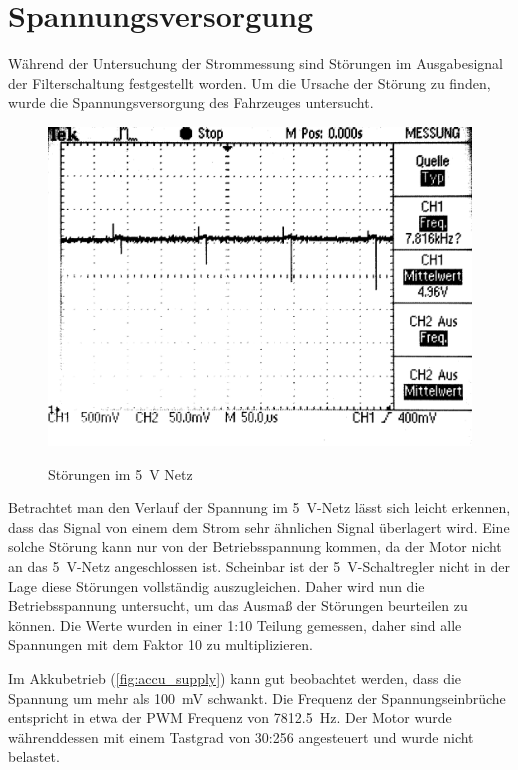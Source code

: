\section{Spannungsversorgung}

Während der Untersuchung der Strommessung sind Störungen im Ausgabesignal der Filterschaltung festgestellt worden. Um die Ursache der Störung zu finden, wurde die Spannungsversorgung
des Fahrzeuges untersucht.

\begin{figure}[H]
\centering
\includegraphics[width=.8\textwidth]{5V_supply.png}\\
\caption{Störungen im \SI{5}{\V} Netz}%
\label{fig:5V Supply}
\end{figure}

Betrachtet man den Verlauf der Spannung im \SI{5}{\V}-Netz lässt sich leicht erkennen, dass das Signal von einem dem Strom sehr ähnlichen Signal überlagert wird.
Eine solche Störung kann nur von der Betriebsspannung kommen, da der Motor nicht an das \SI{5}{\V}-Netz angeschlossen ist. Scheinbar ist der \SI{5}{\V}-Schaltregler nicht in der
Lage diese Störungen vollständig auszugleichen.
Daher wird nun die Betriebsspannung untersucht, um das Ausmaß der Störungen beurteilen zu können.
Die Werte wurden in einer 1:10 Teilung gemessen, daher sind alle Spannungen mit dem Faktor 10 zu multiplizieren.

Im Akkubetrieb (\cref{fig:accu_supply}) kann gut beobachtet werden, dass die Spannung um mehr als \SI{100}{\mV} schwankt. Die Frequenz der Spannungseinbrüche entspricht in etwa
der PWM Frequenz von \SI{7812,5}{\hertz}.  Der Motor wurde währenddessen mit einem Tastgrad von 30:256 angesteuert und wurde nicht belastet.


